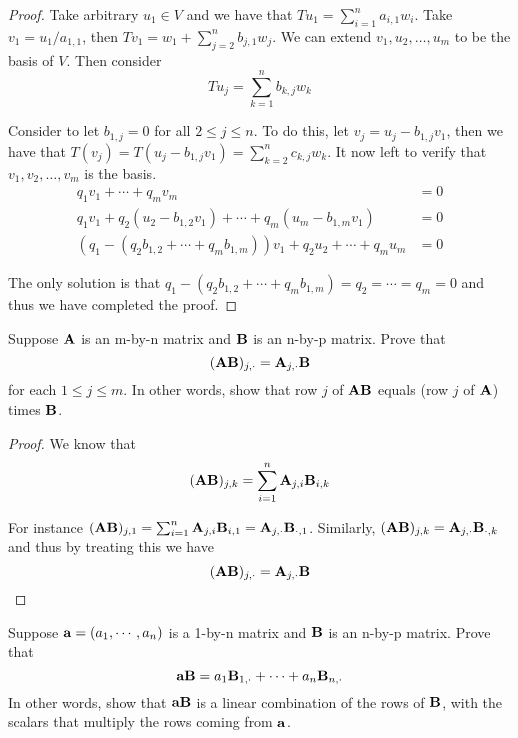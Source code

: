 \documentclass{extarticle}
\begin{document}
\begin{proof}

Take arbitrary \(u_1 \in V\) and we have that \(T u_1 = \sum_{i=1}^{n} a_{i, 1} w_i\). Take 
\(v_1 = u_1 / a_{1, 1}\), then \(T v_1 = w_1 + \sum_{j=2}^{n} b_{j, 1} w_j\). We can extend 
\(v_1, u_2, \ldots, u_m\) to be the basis of \(V\). Then consider 
\[T u_j = \sum_{k=1}^{n}b_{k, j} w_k\]

Consider to let \(b_{1, j} = 0\) for all \( 2 \leq j \leq n\). To do this, let \(v_j = u_j 
- b_{1, j} v_1\), then we have that \(T(v_j) = T(u_j - b_{1, j} v_1) = \sum_{k=2}^{n} c_{k, j} w_k\). 
It now left to verify that \(v_1, v_2, \ldots, v_m\) is the basis. 
\begin{align*}
    q_1 v_1 + \cdots + q_m v_m &= 0 \\ 
    q_1 v_1 + q_2(u_2 - b_{1, 2} v_1) + \cdots + q_m (u_m - b_{1, m} v_1) &= 0 \\ 
    (q_1 - (q_2 b_{1, 2} + \cdots + q_m b_{1, m})) v_1 + q_2 u_2 + \cdots + q_m u_m &= 0 
\end{align*}

The only solution is that \(q_1 - (q_2 b_{1,2} + \cdots + q_m b_{1, m}) = q_2 = \cdots = q_m = 0\)
and thus we have completed the proof. 
\end{proof}



\begin{problem}{8}
    Suppose \(\mathbf{A}\) is an m-by-n matrix and \(\mathbf{B}\) is an n-by-p matrix. Prove that 
    \[(\mathbf{A} \mathbf{B})_{j, \cdot} = \mathbf{A}_{j, \cdot} \mathbf{B}\]
    for each \(1 \leq j \leq m \). In other words, show that row \(j\) of \(\mathbf{A} \mathbf{B}\) equals 
    (row \(j\) of \(\mathbf{A}\)) times \(\mathbf{B}\). 
\end{problem}

\begin{proof}
We know that 
\[(\mathbf{A} \mathbf{B})_{j, k} = \sum_{i=1}^{n}\mathbf{A}_{j, i} \mathbf{B}_{i, k}\]

For instance \((\mathbf{A} \mathbf{B})_{j, 1} = \sum_{i=1}^{n}\mathbf{A}_{j, i} \mathbf{B}_{i, 1} = \mathbf{A}_{j, \cdot} \mathbf{B}_{\cdot, 1}\). 
Similarly, \((\mathbf{A} \mathbf{B})_{j, k} = \mathbf{A}_{j, \cdot} \mathbf{B}_{\cdot, k}\) and thus by treating this we have 
\[(\mathbf{A} \mathbf{B})_{j, \cdot} = \mathbf{A}_{j, \cdot} \mathbf{B}\] 
\end{proof}

\begin{problem}{9}
    Suppose \(\mathbf{a} = (a_1, \cdots, a_n)\) is a 1-by-n matrix and \(\mathbf{B}\) is an n-by-p matrix. 
    Prove that 
    \[\mathbf{a} \mathbf{B} = a_1 \mathbf{B}_{1, \cdot} + \cdots + a_n \mathbf{B}_{n, \cdot}\]
    In other words, show that \(\mathbf{a} \mathbf{B}\) is a linear combination of the rows of \(\mathbf{B}\), 
    with the scalars that multiply the rows coming from \(\mathbf{a}\).
\end{problem}
\end{document}
